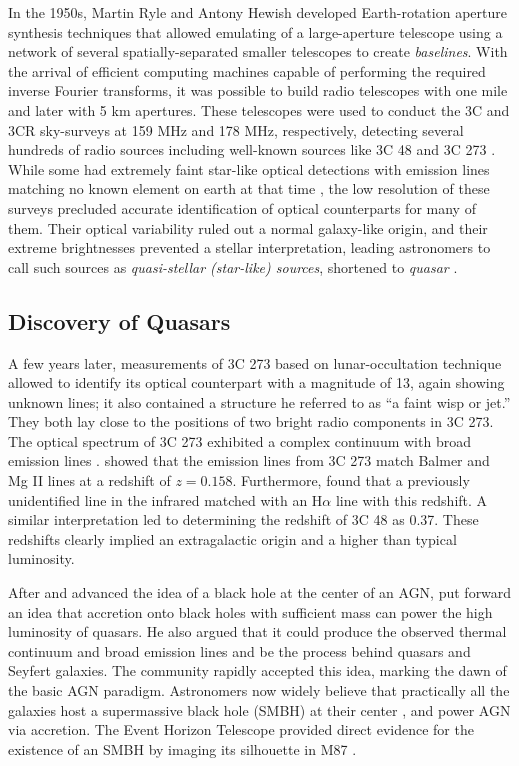 In the 1950s, Martin Ryle and Antony Hewish developed Earth-rotation aperture synthesis techniques that allowed emulating of a large-aperture telescope using a network of several spatially-separated smaller telescopes to create \textit{baselines}. With the arrival of efficient computing machines capable of performing the required inverse Fourier transforms, it was possible to build radio telescopes with one mile and later with 5 km apertures. These telescopes 
were used to conduct the 3C and 3CR sky-surveys at 159 MHz and 178 MHz, respectively, detecting several hundreds of radio sources including well-known sources like 3C 48 and 3C 273 \citep{1959MmRAS..68...37E,10.1093/mnras/125.1.75}. While some had extremely faint star-like optical detections with emission lines matching no known element on earth at that time \citep{1963ApJ...138...30M}, the low resolution of these surveys precluded accurate identification of optical counterparts for many of them. Their optical variability ruled out a normal galaxy-like origin, and their extreme brightnesses prevented a stellar interpretation, leading astronomers to call such sources as \textit{quasi-stellar (star-like) sources}, shortened to \textit{quasar} \citep{chiu1964gravitational}. 

\subsection{Discovery of Quasars}
A few years later, measurements of 3C 273 based on lunar-occultation technique allowed  \citet{schmidt19633c} to identify its optical counterpart with a magnitude of 13, again showing unknown lines; it also contained a structure he referred to as ``a faint wisp or jet.'' They both lay close to the positions of two bright radio components in 3C 273. The optical spectrum of  3C 273 exhibited a complex continuum with broad emission lines \citep{oke1963absolute}.
\citet{schmidt19633c} showed that the emission lines from 3C 273 match Balmer and Mg II lines at a redshift of $z=0.158$. Furthermore, \citep{oke1963absolute} found that a previously unidentified line in the infrared matched with an H$\alpha$ line with this redshift. A similar interpretation led to determining the redshift of 3C 48 as 0.37. These redshifts clearly implied an extragalactic origin and a higher than typical luminosity.

After \citet{salpeter1964accretion} and \citet{zel1964estimating} advanced the idea of a black hole at the center of an AGN, \citet{lynden1969galactic} put forward an idea that accretion onto black holes with sufficient mass can power the high luminosity of quasars. He also argued that it could produce the observed thermal continuum and broad emission lines and be the process behind quasars and Seyfert galaxies. The community rapidly accepted this idea, marking the dawn of the basic AGN paradigm. Astronomers now widely believe that practically all the galaxies host a supermassive black hole (SMBH) at their center \citep[e.g.,][]{richstone1998supermassive}, and power AGN via accretion. The Event Horizon Telescope provided direct evidence for the existence of an SMBH by imaging its silhouette in M87 \citep{2019ApJ...875L...1E}.

